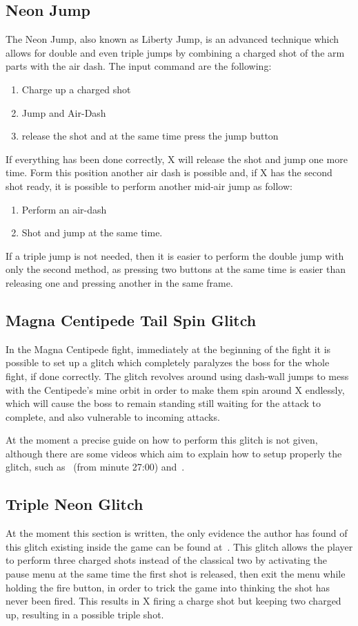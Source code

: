 \subsection{Neon Jump}\label{Neon_jump}
The Neon Jump, also known as Liberty Jump, is an advanced technique which allows for double and even triple jumps by combining a charged shot of the arm parts with the air dash. The input command are the following:
\begin{enumerate}
	\item Charge up a charged shot
	\item Jump and Air-Dash
	\item release the shot and at the same time press the jump button
\end{enumerate}
If everything has been done correctly, X will release the shot and jump one more time. Form this position another air dash is possible and, if X has the second shot ready, it is possible to perform another mid-air jump as follow:
\begin{enumerate}
	\item Perform an air-dash
	\item Shot and jump at the same time.
\end{enumerate}
If a triple jump is not needed, then it is easier to perform the double jump with only the second method, as pressing two buttons at the same time is easier than releasing one and pressing another in the same frame.

\subsection{Magna Centipede Tail Spin Glitch}
In the Magna Centipede fight, immediately at the beginning of the fight it is possible to set up a glitch which completely paralyzes the boss for the whole fight, if done correctly. The glitch revolves around using dash-wall jumps to mess with the Centipede's mine orbit in order to make them spin around X endlessly, which will cause the boss to remain standing still waiting for the attack to complete, and also vulnerable to incoming attacks. 

At the moment a precise guide on how to perform this glitch is not given, although there are some videos which aim to explain how to setup properly the glitch, such as~\cite{video:tail_spin_1} (from minute 27:00) and~\cite{video:tail_spin_2}.

\subsection{Triple Neon Glitch}
At the moment this section is written, the only evidence the author has found of this glitch existing inside the game can be found at~\cite{video:triple_glitch}. This glitch allows the player to perform three charged shots instead of the classical two by activating the pause menu at the same time the first shot is released, then exit the menu while holding the fire button, in order to trick the game into thinking the shot has never been fired. This results in X firing a charge shot but keeping two charged up, resulting in a possible triple shot.

